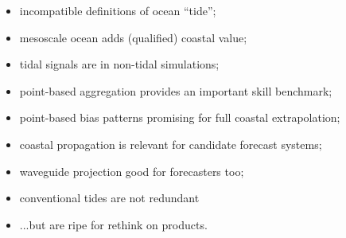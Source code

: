 
\begin{itemize}
    \item incompatible definitions of ocean ``tide'';
    \item mesoscale ocean adds (qualified) coastal value;
    \item tidal signals are in non-tidal simulations;
    \item point-based aggregation provides an important skill benchmark;
    \item point-based bias patterns promising for full coastal extrapolation;
    \item coastal propagation is relevant for candidate forecast systems;
    \item waveguide projection good for forecasters too;  
    \item conventional tides are not redundant
    \item ...but are ripe for rethink on products.
\end{itemize}